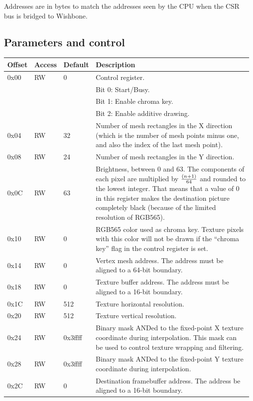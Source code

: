 \documentclass[a4paper,11pt]{article}
\begin{document}
Addresses are in bytes to match the addresses seen by the CPU when the CSR bus is bridged to Wishbone.

\subsection{Parameters and control}
\begin{tabularx}{\textwidth}{|l|l|l|X|}
\hline
\bf{Offset} & \bf{Access} & \bf{Default} & \bf{Description} \\
\hline
0x00 & RW & 0 & Control register. \\
& & & Bit 0: Start/Busy.\\
& & & Bit 1: Enable chroma key. \\
& & & Bit 2: Enable additive drawing. \\
\hline
0x04 & RW & 32 & Number of mesh rectangles in the X direction (which is the number of mesh points minus one, and also the index of the last mesh point). \\
\hline
0x08 & RW & 24 & Number of mesh rectangles in the Y direction. \\
\hline
0x0C & RW & 63 & Brightness, between 0 and 63. The components of each pixel are multiplied by $ (n+1) \over 64 $ and rounded to the lowest integer. That means that a value of 0 in this register makes the destination picture completely black (because of the limited resolution of RGB565). \\
\hline
0x10 & RW & 0 & RGB565 color used as chroma key. Texture pixels with this color will not be drawn if the ``chroma key'' flag in the control register is set. \\
\hline
0x14 & RW & 0 & Vertex mesh address. The address must be aligned to a 64-bit boundary. \\
\hline
0x18 & RW & 0 & Texture buffer address. The address must be aligned to a 16-bit boundary. \\
\hline
0x1C & RW & 512 & Texture horizontal resolution. \\
\hline
0x20 & RW & 512 & Texture vertical resolution. \\
\hline
0x24 & RW & 0x3ffff & Binary mask ANDed to the fixed-point X texture coordinate during interpolation. This mask can be used to control texture wrapping and filtering. \\
\hline
0x28 & RW & 0x3ffff & Binary mask ANDed to the fixed-point Y texture coordinate during interpolation. \\
\hline
0x2C & RW & 0 & Destination framebuffer address. The address be aligned to a 16-bit boundary. \\

\end{tabularx}
\end{document}
